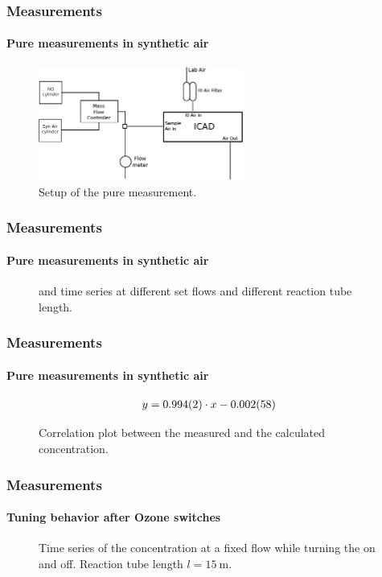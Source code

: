 \documentclass[english]{beamer}
\begin{document}
\begin{frame}
  \frametitle{Measurements}
  \framesubtitle{Pure  measurements in synthetic air}
  \begin{figure}[htbp]
    \centering
    \includegraphics[width=0.6\textwidth]{no_setup.eps}
    \caption{Setup of the pure  measurement.}
    \label{fig:no-setup}
  \end{figure}
\end{frame}

\begin{frame}
  \frametitle{Measurements}
  \framesubtitle{Pure  measurements in synthetic air}
  \begin{figure}[htbp]
    \centering
    \scalebox{.7}{
      
    }
    \hspace{1cm}
    \scalebox{.7}{
      
    }
    \caption{ and  time series at different set 
      flows and different reaction tube length.}
    \label{fig:flow}
  \end{figure}
\end{frame}

\begin{frame}
  \frametitle{Measurements}
  \framesubtitle{Pure  measurements in synthetic air}
  \begin{align*}
    y = \num{0.994\pm 0.002} \cdot x - \num{0.002 \pm 0.058}
  \end{align*}

  \begin{figure}[htbp]
    \centering
    \scalebox{.6}{
      
    }
    \caption{Correlation plot between the measured and the calculated
       concentration.}
    \label{fig:flow}
  \end{figure}
\end{frame}

\begin{frame}
  \frametitle{Measurements}
  \framesubtitle{Tuning behavior after Ozone switches}
  \begin{figure}[htbp]
    \centering
    \scalebox{.6}{
      
    }
    \caption{Time series of the  concentration at a fixed
       flow while turning the  on and off. Reaction tube
    length \(l= \SI{15}{\meter}\).}
    \label{fig:flow}
  \end{figure}
\end{frame}
\end{document}
